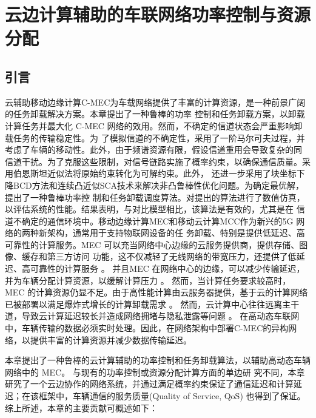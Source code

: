 \chapter{云边计算辅助的车联网络功率控制与资源分配} \label{chap:table 第三章}  %

\section{引言}\label{section3-1}
云辅助移动边缘计算C-MEC为车载网络提供了丰富的计算资源，是一种前景广阔的任务卸载解决方案。本章提出了一种鲁棒的功率
控制和任务卸载方案，以卸载计算任务并最大化 C-MEC 网络的效用。然而，不确定的信道状态会严重影响卸载任务的传输稳定性。为
了模拟信道的不确定性，采用了一阶马尔可夫过程，并考虑了车辆的移动性。此外，由于频谱资源有限，假设信道重用会导致复杂的同
信道干扰。为了克服这些限制，对信号链路实施了概率约束，以确保通信质量。采用伯恩斯坦近似法将原始约束转化为可解约束。此外，
还进一步采用了块坐标下降BCD方法和连续凸近似SCA技术来解决非凸鲁棒性优化问题。为确定最优解，提出了一种鲁棒功率控
制和任务卸载调度算法。对提出的算法进行了数值仿真，以评估系统的性能。结果表明，与对比模型相比，该算法是有效的，尤其是在
信道不确定的通信环境中。移动边缘计算MEC和移动云计算MCC作为新兴的5G 网络的两种新架构，通常用于支持物联网设备的任
务卸载、特别是提供低延迟、高可靠性的计算服务。MEC 可以充当网络中心边缘的云服务提供商，提供存储、图像、缓存和第三方访问
功能，这不仅减轻了无线网络的带宽压力，还提供了低延迟、高可靠性的计算服务 \supercite{基于车辆边缘计算的任务卸载策略研究}。
并且MEC 在网络中心的边缘，可以减少传输延迟，并为车辆分配计算资源，以缓解计算压力 \supercite{CCO}。 然而，当计算任务要求较高时，
MEC 的计算资源仍显不足。由于高性能计算由云服务器提供，基于云的计算网络已被部署以满足爆炸式增长的计算卸载需求 \supercite{SurveyMEC2017,SurveyMEC2018,DistributedTask2024}。  %
然而，云计算中心往往远离主干道，导致云计算延迟较长并造成网络拥堵与隐私泄露等问题 \supercite{Qian2023, 曹宇慧车载边缘计算环境下任务协同卸载方法研究,云计算隐私10418975}。
在高动态车联网中，车辆传输的数据必须实时处理。因此，在网络架构中部署C-MEC的异构网络，以提供丰富的计算资源并减少数据传输延迟。

本章提出了一种鲁棒的云计算辅助的功率控制和任务卸载算法，以辅助高动态车辆网络中的 MEC。 与现有的功率控制或资源分配计算方面的单边研
究不同，本章研究了一个云边协作的网络系统，并通过满足概率约束保证了通信延迟和计算延迟；在该框架中，车辆通信的服务质量(Quality of Service, QoS)
也得到了保证。 综上所述，本章的主要贡献可概述如下：

